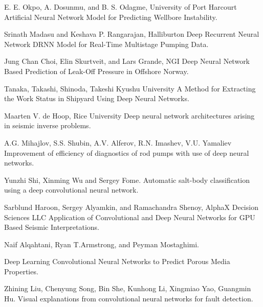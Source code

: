 \documentclass[english]{article}
\begin{document}
\begin{thebibliography}{1}
E. E. Okpo, A. Dosunmu, and B. S. Odagme, University of Port Harcourt
\newblock Artificial Neural Network Model for Predicting Wellbore Instability.

Srinath Madasu and Keshava P. Rangarajan, Halliburton
\newblock Deep Recurrent Neural Network DRNN Model for Real-Time Multistage Pumping Data.

Jung Chan Choi, Elin Skurtveit, and Lars Grande, NGI
\newblock Deep Neural Network Based Prediction of Leak-Off Pressure in Offshore Norway.

Tanaka, Takashi, Shinoda, Takeshi Kyushu University
\newblock A Method for Extracting the Work Status in Shipyard Using Deep Neural Networks.

Maarten V. de Hoop, Rice University
\newblock Deep neural network architectures arising in seismic inverse problems.

A.G. Mihajlov, S.S. Shubin, A.V. Alferov, R.N. Imashev, V.U. Yamaliev
\newblock Improvement of efficiency of diagnostics of rod pumps with use of deep neural networks.

Yunzhi Shi, Xinming Wu and Sergey Fome.
\newblock Automatic salt-body classification using a deep convolutional neural network.

Sarblund Haroon, Sergey Alyamkin, and Ramachandra Shenoy, AlphaX Decision Sciences LLC
\newblock Application of Convolutional and Deep Neural Networks for GPU Based Seismic Interpretations.

Naif Alqahtani, Ryan T.Armstrong, and Peyman Mostaghimi.

\newblock Deep Learning Convolutional Neural Networks to Predict Porous Media Properties.

Zhining Liu, Chenyung Song, Bin She, Kunhong Li, Xingmiao Yao, Guangmin Hu.
\newblock Visual explanations from convolutional neural networks for fault detection.


\end{thebibliography}

\newpage

%
%
%
%
%
%
%
%
%
%
%
%
%
%
%
\printnomenclature
\end{document}
